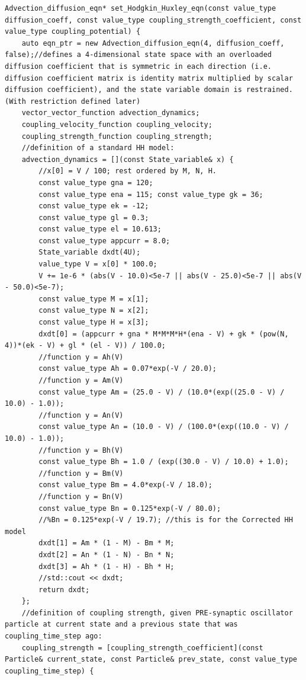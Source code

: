 \documentclass[10pt]{article} %
\begin{document}
\begin{lstlisting}
Advection_diffusion_eqn* set_Hodgkin_Huxley_eqn(const value_type diffusion_coeff, const value_type coupling_strength_coefficient, const value_type coupling_potential) {
    auto eqn_ptr = new Advection_diffusion_eqn(4, diffusion_coeff, false);//defines a 4-dimensional state space with an overloaded diffusion coefficient that is symmetric in each direction (i.e. diffusion coefficient matrix is identity matrix multiplied by scalar diffusion coefficient), and the state variable domain is restrained. (With restriction defined later)
    vector_vector_function advection_dynamics;
    coupling_velocity_function coupling_velocity;
    coupling_strength_function coupling_strength;
    //definition of a standard HH model: 
    advection_dynamics = [](const State_variable& x) {
        //x[0] = V / 100; rest ordered by M, N, H. 
        const value_type gna = 120;
        const value_type ena = 115; const value_type gk = 36;
        const value_type ek = -12;
        const value_type gl = 0.3;
        const value_type el = 10.613;
        const value_type appcurr = 8.0;
        State_variable dxdt(4U);
        value_type V = x[0] * 100.0;
        V += 1e-6 * (abs(V - 10.0)<5e-7 || abs(V - 25.0)<5e-7 || abs(V - 50.0)<5e-7);
        const value_type M = x[1];
        const value_type N = x[2];
        const value_type H = x[3];
        dxdt[0] = (appcurr + gna * M*M*M*H*(ena - V) + gk * (pow(N, 4))*(ek - V) + gl * (el - V)) / 100.0;
        //function y = Ah(V)
        const value_type Ah = 0.07*exp(-V / 20.0);
        //function y = Am(V)
        const value_type Am = (25.0 - V) / (10.0*(exp((25.0 - V) / 10.0) - 1.0));
        //function y = An(V)
        const value_type An = (10.0 - V) / (100.0*(exp((10.0 - V) / 10.0) - 1.0));
        //function y = Bh(V)
        const value_type Bh = 1.0 / (exp((30.0 - V) / 10.0) + 1.0);
        //function y = Bm(V)
        const value_type Bm = 4.0*exp(-V / 18.0);
        //function y = Bn(V)
        const value_type Bn = 0.125*exp(-V / 80.0);
        //%Bn = 0.125*exp(-V / 19.7); //this is for the Corrected HH model
        dxdt[1] = Am * (1 - M) - Bm * M;
        dxdt[2] = An * (1 - N) - Bn * N;
        dxdt[3] = Ah * (1 - H) - Bh * H;
        //std::cout << dxdt;
        return dxdt;
    };
    //definition of coupling strength, given PRE-synaptic oscillator particle at current state and a previous state that was coupling_time_step ago:
    coupling_strength = [coupling_strength_coefficient](const Particle& current_state, const Particle& prev_state, const value_type coupling_time_step) {

\end{lstlisting}
\end{document}

